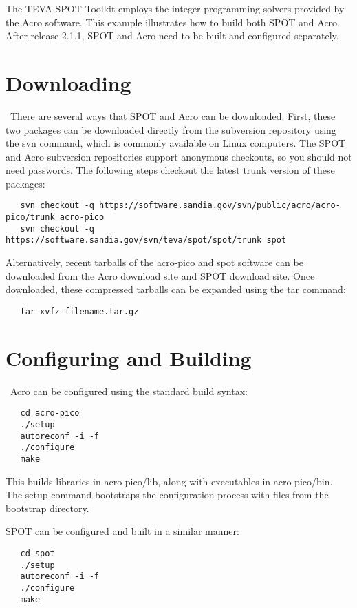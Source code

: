 The TEVA-SPOT Toolkit employs the integer programming solvers provided by the  Acro software. This example illustrates how to build both SPOT and Acro. After release 2.1.1, SPOT and Acro need to be built and configured separately.

\section{Downloading}\
There are several ways that SPOT and Acro can be downloaded. First, these two packages can be downloaded directly from the subversion repository using the svn command, which is commonly available on Linux computers. The SPOT and Acro subversion repositories support anonymous checkouts, so you should not need passwords. The following steps checkout the latest trunk version of these packages:
\begin{verbatim}
   svn checkout -q https://software.sandia.gov/svn/public/acro/acro-pico/trunk acro-pico
   svn checkout -q https://software.sandia.gov/svn/teva/spot/spot/trunk spot
\end{verbatim}
Alternatively, recent tarballs of the acro-pico and spot software can be downloaded from the  Acro download site and SPOT download site. Once downloaded, these compressed tarballs can be expanded using the tar command:
\begin{verbatim}
   tar xvfz filename.tar.gz
\end{verbatim}

\section{Configuring and Building}\
Acro can be configured using the standard build syntax:
\begin{verbatim}
   cd acro-pico
   ./setup
   autoreconf -i -f
   ./configure
   make
\end{verbatim}
This builds libraries in acro-pico/lib, along with executables in acro-pico/bin. The setup command bootstraps the configuration process with files from the bootstrap directory.

SPOT can be configured and built in a similar manner:
\begin{verbatim}
   cd spot
   ./setup
   autoreconf -i -f
   ./configure
   make
\end{verbatim}
